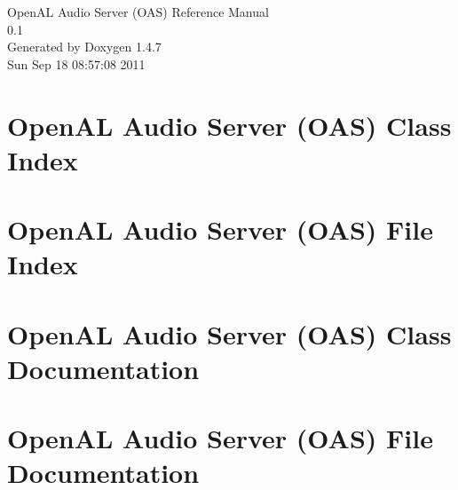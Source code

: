 \documentclass[a4paper]{book}
\begin{document}
\begin{titlepage}
\vspace*{7cm}
\begin{center}
{\Large Open\-AL Audio Server (OAS) Reference Manual\\[1ex]\large 0.1 }\\
\vspace*{1cm}
{\large Generated by Doxygen 1.4.7}\\
\vspace*{0.5cm}
{\small Sun Sep 18 08:57:08 2011}\\
\end{center}
\end{titlepage}
\clearemptydoublepage
{}
\tableofcontents
\clearemptydoublepage
{}
\chapter{Open\-AL Audio Server (OAS) Class Index}

\chapter{Open\-AL Audio Server (OAS) File Index}

\chapter{Open\-AL Audio Server (OAS) Class Documentation}


\chapter{Open\-AL Audio Server (OAS) File Documentation}









\printindex
\end{document}
